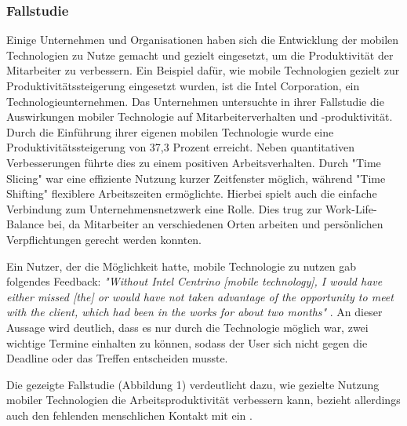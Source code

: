 \documentclass[12pt,a4paper]{article}
\begin{document}
\subsubsection*{Fallstudie}
Einige Unternehmen und Organisationen haben sich die Entwicklung der mobilen Technologien zu Nutze gemacht und gezielt eingesetzt, um die Produktivität der Mitarbeiter zu verbessern. Ein Beispiel dafür, wie mobile Technologien gezielt zur Produktivitätssteigerung eingesetzt wurden, ist die Intel Corporation, ein Technologieunternehmen. Das Unternehmen untersuchte in ihrer Fallstudie die Auswirkungen mobiler Technologie auf Mitarbeiterverhalten und -produktivität. Durch die Einführung ihrer eigenen mobilen Technologie wurde eine Produktivitätssteigerung von 37,3 Prozent erreicht. Neben quantitativen Verbesserungen führte dies zu einem positiven Arbeitsverhalten. Durch "Time Slicing" war eine effiziente Nutzung kurzer Zeitfenster möglich, während "Time Shifting" flexiblere Arbeitszeiten ermöglichte. Hierbei spielt auch die einfache Verbindung zum Unternehmensnetzwerk eine Rolle. Dies trug zur Work-Life-Balance bei, da Mitarbeiter an verschiedenen Orten arbeiten und persönlichen Verpflichtungen gerecht werden konnten. 

	Ein Nutzer, der die Möglichkeit hatte, mobile Technologie zu nutzen gab folgendes Feedback: 
	\emph{"Without Intel Centrino [mobile technology], I would have either missed [the] or would have not taken advantage of the opportunity to meet with the client, which had been in the works for about two months"}  \parencite{govindaraju2005effects}. An dieser Aussage wird deutlich, dass es nur durch die Technologie möglich war, zwei wichtige Termine einhalten zu können, sodass der User sich nicht gegen die Deadline oder das Treffen entscheiden musste.

	Die gezeigte Fallstudie (Abbildung 1) verdeutlicht dazu, wie gezielte Nutzung mobiler Technologien die Arbeitsproduktivität verbessern kann, bezieht allerdings auch den fehlenden menschlichen Kontakt mit ein \parencite[vgl.][]{govindaraju2005effects}.
\end{document}
